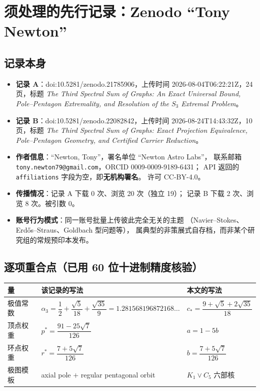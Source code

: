 \documentclass[UTF8,11pt]{ctexart}
\newcommand{\cst}{c_\ast}
\begin{document}
\section{须处理的先行记录：Zenodo ``Tony Newton''}

\subsection{记录本身}

\begin{itemize}[leftmargin=1.4em]
\item \textbf{记录 A}：doi:10.5281/zenodo.21785906，上传时间
2026-08-04T06:22:21Z，24 页，标题
\emph{The Third Spectral Sum of Graphs: An Exact Universal Bound,
Pole--Pentagon Extremality, and Resolution of the $S_3$ Extremal Problem}。
\item \textbf{记录 B}：doi:10.5281/zenodo.22082842，上传时间
2026-08-24T14:43:32Z，10 页，标题
\emph{The Third Spectral Sum of Graphs: Exact Projection Equivalence,
Pole--Pentagon Geometry, and Certified Carrier Reduction}。
\item \textbf{作者信息}：``Newton, Tony''，署名单位 ``Newton Astro Labs''，
联系邮箱 \texttt{tony.newton79@gmail.com}，ORCID 0009-0009-9189-6431；
API 返回的 \texttt{affiliations} 字段为空，即\textbf{无机构署名}。
许可 CC-BY-4.0。
\item \textbf{传播情况}：记录 A 下载 0 次、浏览 20 次（独立 19）；
记录 B 下载 2 次、浏览 8 次。被引数 0。
\item \textbf{账号行为模式}：同一账号批量上传彼此完全无关的主题
（Navier--Stokes、Erd\H{o}s--Straus、Goldbach 型问题等），
属典型的非策展式自存档，而非某个研究组的常规预印本发布。
\end{itemize}

\subsection{逐项重合点（已用 60 位十进制精度核验）}

\begin{center}\small
\begin{tabular}{@{}lll@{}}
\toprule
量 & 该记录的写法 & 本文的写法\\
\midrule
极值常数 &
$\alpha_3=\dfrac12+\dfrac{\sqrt5}{18}+\dfrac{\sqrt{35}}9=1.281568196872168\ldots$ &
$\cst=\dfrac{9+\sqrt5+2\sqrt{35}}{18}$\\[2pt]
顶点权重 & $p^\ast=\dfrac{91-25\sqrt7}{126}$ & $a=1-5b$\\[2pt]
环点权重 & $r^\ast=\dfrac{7+5\sqrt7}{126}$ & $b=\dfrac{7+5\sqrt7}{126}$\\[2pt]
极图模板 & axial pole $+$ regular pentagonal orbit & $K_1\vee C_5$ 六部核\\
\bottomrule
\end{tabular}
\end{center}
\end{document}

